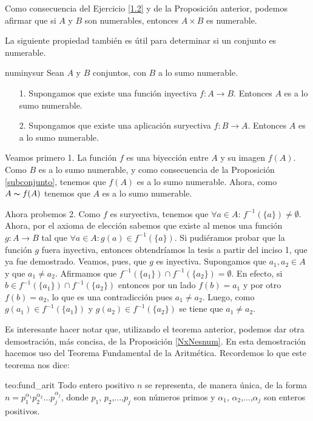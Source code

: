 Como consecuencia del Ejercicio \vref{1.2} y de la Proposición
anterior, podemos afirmar que si $A$ y $B$ son numerables,
entonces $A\times B$ es numerable.



La siguiente propiedad también es útil para determinar si un
conjunto es numerable.

\begin{proposicion}{numinysur} Sean $A$ y $B$ conjuntos, con $B$ a lo sumo
numerable.
\begin{itemize}
\item[1.] Supongamos que existe una función inyectiva $f:A\longrightarrow
B$. Entonces $A$ es a lo sumo numerable.
\item[2.] Supongamos que existe una aplicación suryectiva
$f:B\longrightarrow A$. Entonces $A$ es a lo sumo numerable.
\end{itemize}
\end{proposicion}
\begin{demo} Veamos primero 1. La función $f$ es  una biyección entre $A$ y su
imagen $f(A)$. Como $B$ es a lo sumo numerable,  y como
consecuencia de la Proposición \vref{subconjunto}, tenemos que
$f(A)$ es a lo sumo numerable. Ahora, como $A\thicksim f(A)$
tenemos que $A$ es a lo sumo numerable.

Ahora probemos 2. Como $f$ es suryectiva, tenemos que $\forall
a\in A$: $f^{-1}(\{a\})\neq\emptyset$. Ahora, por el axioma de
elección sabemos que existe al menos una función
$g:A\longrightarrow B$ tal que $\forall a\in A:g(a)\in
f^{-1}(\{a\})$. Si pudiéramos probar que la función $g$ fuera
inyectiva, entonces obtendríamos la tesis a partir del inciso
1, que ya fue demostrado. Veamos, pues, que $g$ es inyectiva.
Supongamos que $a_1,a_2\in A$ y que $a_1\neq a_2$. Afirmamos que
$f^{-1}(\{a_1\})\cap f^{-1}(\{a_2\})=\emptyset$. En efecto, si
$b\in f^{-1}(\{a_1\})\cap f^{-1}(\{a_2\})$ entonces por un lado
 $f(b)=a_1$ y por otro $f(b)=a_2$, lo que es una contradicción pues $a_1\neq a_2$. Luego, como $g(a_1)\in f^{-1}(\{a_1\})$ y 
$g(a_2)\in f^{-1}(\{a_2\})$ se tiene que $a_1\neq a_2$.
 \end{demo}

Es interesante hacer notar que, utilizando el teorema anterior,
podemos dar otra demostración, más concisa, de la
Proposición \vref{NxNesnum}. En esta demostración hacemos uso del Teorema Fundamental de la
Aritmética. Recordemos lo que este teorema nos dice:


\begin{teorema}{teo:fund_arit} Todo entero positivo $n$ se representa, de
manera única, de la forma $n=p_1^{\alpha_1}p_2^{\alpha_2}\dots
p_j^{\alpha_j}$, donde $p_1$, $p_2$,...,$p_j$ son números primos
y $\alpha_1$, $\alpha_2$,...,$\alpha_j$ son enteros positivos.
\end{teorema}

